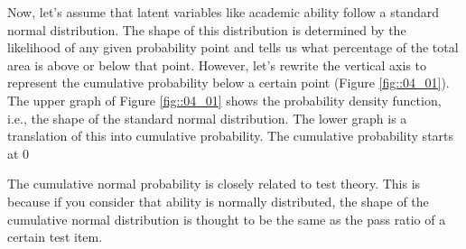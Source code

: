 \documentclass{ltjsbook}
\begin{document}
Now, let's assume that latent variables like academic ability follow a standard normal distribution. The shape of this distribution is determined by the likelihood of any given probability point and tells us what percentage of the total area is above or below that point. However, let's rewrite the vertical axis to represent the cumulative probability below a certain point (Figure \ref{fig::04_01}). The upper graph of Figure \ref{fig::04_01} shows the probability density function, i.e., the shape of the standard normal distribution. The lower graph is a translation of this into cumulative probability. The cumulative probability starts at 0%



The cumulative normal probability is closely related to test theory. This is because if you consider that ability is normally distributed, the shape of the cumulative normal distribution is thought to be the same as the pass ratio of a certain test item.
\end{document}
